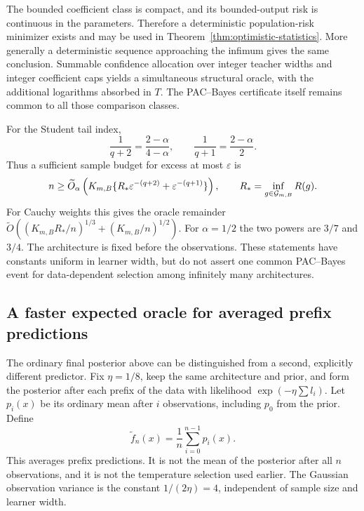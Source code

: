 The bounded coefficient class is compact, and its bounded-output risk is continuous in the parameters. Therefore a deterministic population-risk minimizer exists and may be used in Theorem~\ref{thm:optimistic-statistics}. More generally a deterministic sequence approaching the infimum gives the same conclusion. Summable confidence allocation over integer teacher widths and integer coefficient caps yields a simultaneous structural oracle, with the additional logarithms absorbed in $T$. The PAC--Bayes certificate itself remains common to all those comparison classes.

For the Student tail index,
\[
 \frac1{q+2}=\frac{2-\alpha}{4-\alpha},\qquad
 \frac1{q+1}=\frac{2-\alpha}{2}.
\]
Thus a sufficient sample budget for excess at most $\varepsilon$ is
\[
 n\ge\widetilde O_{\alpha}\left(
 K_{m,B}\{R_*\varepsilon^{-(q+2)}
                       +\varepsilon^{-(q+1)}\}\right),
 \qquad R_*=\inf_{g\in\mathcal G_{m,B}}R(g).
\]
For Cauchy weights this gives the oracle remainder
$\widetilde O((K_{m,B}R_*/n)^{1/3}+(K_{m,B}/n)^{1/2})$.
For $\alpha=1/2$ the two powers are $3/7$ and $3/4$.
The architecture is fixed before the observations. These statements have constants uniform in learner width, but do not assert one common PAC--Bayes event for data-dependent selection among infinitely many architectures.

\subsection{A faster expected oracle for averaged prefix predictions}
The ordinary final posterior above can be distinguished from a second, explicitly different predictor. Fix $\eta=1/8$, keep the same architecture and prior, and form the posterior after each prefix of the data with likelihood $\exp(-\eta\sum l_i)$. Let $p_i(x)$ be its ordinary mean after $i$ observations, including $p_0$ from the prior. Define
\[
 \widetilde f_n(x)=\frac1n\sum_{i=0}^{n-1}p_i(x).
\]
This averages prefix predictions. It is not the mean of the posterior after all $n$ observations, and it is not the temperature selection used earlier. The Gaussian observation variance is the constant $1/(2\eta)=4$, independent of sample size and learner width.

